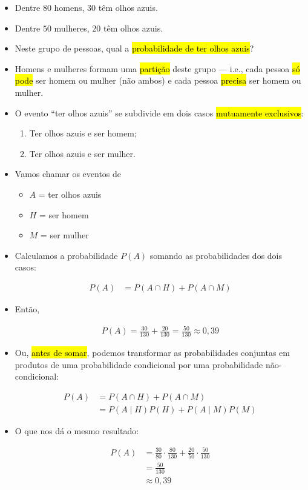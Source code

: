 \documentclass[
  11pt]{report}
\begin{document}
\begin{itemize}
\item
  Dentre $80$ homens, $30$ têm olhos azuis.
\item
  Dentre $50$ mulheres, $20$ têm olhos azuis.
\item
  Neste grupo de pessoas, qual a {\hl{probabilidade de ter olhos azuis}}?
\item
  Homens e mulheres formam uma {\hl{partição}} deste grupo --- i.e., cada pessoa {\hl{só pode}} ser homem ou mulher (não ambos) e cada pessoa {\hl{precisa}} ser homem ou mulher.
\item
  O evento ``ter olhos azuis'' se subdivide em dois casos {\hl{mutuamente exclusivos}}:

  \begin{enumerate}
  \def\labelenumi{\arabic{enumi}.}
  \item
    Ter olhos azuis e ser homem;
  \item
    Ter olhos azuis e ser mulher.
  \end{enumerate}
\item
  Vamos chamar os eventos de

  \begin{itemize}
  \item
    $A$ = ter olhos azuis
  \item
    $H$ = ser homem
  \item
    $M$ = ser mulher
  \end{itemize}
\item
  Calculamos a probabilidade $P(A)$ somando as probabilidades dos dois casos:

  \[
  \begin{aligned}
  P(A) &= P(A \cap H) + P(A \cap M)
  \end{aligned}
  \]
\item
  Então,

  \[
  \begin{aligned}
  P(A) = \frac{30}{130} + \frac{20}{130} = \frac{50}{130} \approx 0{,}39
  \end{aligned}
  \]
\item
  Ou, {\hl{antes de somar}}, podemos transformar as probabilidades conjuntas em produtos de uma probabilidade condicional por uma probabilidade não-condicional:

  \[
  \begin{aligned}
  P(A) &= P(A \cap H) + P(A \cap M) \\
       &= P(A \mid H) P(H) + P(A \mid M) P(M)
  \end{aligned}
  \]
\item
  O que nos dá o mesmo resultado:

  \[
  \begin{aligned}
  P(A) &= \frac{30}{80} \cdot \frac{80}{130} + \frac{20}{50} \cdot \frac{50}{130} \\
       &= \frac{50}{130} \\
       &\approx 0{,}39
  \end{aligned}
  \]
\end{itemize}
\end{document}
